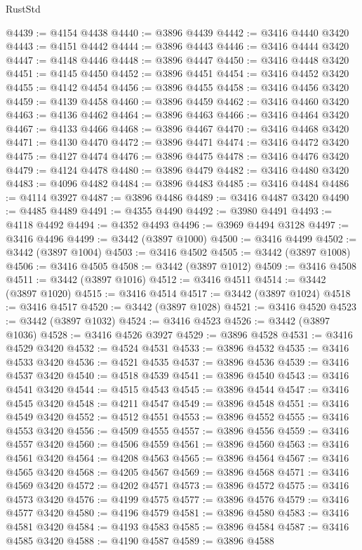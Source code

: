 \begin{lexlean}{RustStd}
\begin{coremodule}
@4439 := @4154 @4438
@4440 := @3896 @4439
@4442 := @3416 @4440 @3420
@4443 := @4151 @4442
@4444 := @3896 @4443
@4446 := @3416 @4444 @3420
@4447 := @4148 @4446
@4448 := @3896 @4447
@4450 := @3416 @4448 @3420
@4451 := @4145 @4450
@4452 := @3896 @4451
@4454 := @3416 @4452 @3420
@4455 := @4142 @4454
@4456 := @3896 @4455
@4458 := @3416 @4456 @3420
@4459 := @4139 @4458
@4460 := @3896 @4459
@4462 := @3416 @4460 @3420
@4463 := @4136 @4462
@4464 := @3896 @4463
@4466 := @3416 @4464 @3420
@4467 := @4133 @4466
@4468 := @3896 @4467
@4470 := @3416 @4468 @3420
@4471 := @4130 @4470
@4472 := @3896 @4471
@4474 := @3416 @4472 @3420
@4475 := @4127 @4474
@4476 := @3896 @4475
@4478 := @3416 @4476 @3420
@4479 := @4124 @4478
@4480 := @3896 @4479
@4482 := @3416 @4480 @3420
@4483 := @4096 @4482
@4484 := @3896 @4483
@4485 := @3416 @4484
@4486 := @4114 @3927
@4487 := @3896 @4486
@4489 := @3416 @4487 @3420
@4490 := @4485 @4489
@4491 := @4355 @4490
@4492 := @3980 @4491
@4493 := @4118 @4492
@4494 := @4352 @4493
@4496 := @3969 @4494 @3128
@4497 := @3416 @4496
@4499 := @3442 (@3897 @1000)
@4500 := @3416 @4499
@4502 := @3442 (@3897 @1004)
@4503 := @3416 @4502
@4505 := @3442 (@3897 @1008)
@4506 := @3416 @4505
@4508 := @3442 (@3897 @1012)
@4509 := @3416 @4508
@4511 := @3442 (@3897 @1016)
@4512 := @3416 @4511
@4514 := @3442 (@3897 @1020)
@4515 := @3416 @4514
@4517 := @3442 (@3897 @1024)
@4518 := @3416 @4517
@4520 := @3442 (@3897 @1028)
@4521 := @3416 @4520
@4523 := @3442 (@3897 @1032)
@4524 := @3416 @4523
@4526 := @3442 (@3897 @1036)
@4528 := @3416 @4526 @3927
@4529 := @3896 @4528
@4531 := @3416 @4529 @3420
@4532 := @4524 @4531
@4533 := @3896 @4532
@4535 := @3416 @4533 @3420
@4536 := @4521 @4535
@4537 := @3896 @4536
@4539 := @3416 @4537 @3420
@4540 := @4518 @4539
@4541 := @3896 @4540
@4543 := @3416 @4541 @3420
@4544 := @4515 @4543
@4545 := @3896 @4544
@4547 := @3416 @4545 @3420
@4548 := @4211 @4547
@4549 := @3896 @4548
@4551 := @3416 @4549 @3420
@4552 := @4512 @4551
@4553 := @3896 @4552
@4555 := @3416 @4553 @3420
@4556 := @4509 @4555
@4557 := @3896 @4556
@4559 := @3416 @4557 @3420
@4560 := @4506 @4559
@4561 := @3896 @4560
@4563 := @3416 @4561 @3420
@4564 := @4208 @4563
@4565 := @3896 @4564
@4567 := @3416 @4565 @3420
@4568 := @4205 @4567
@4569 := @3896 @4568
@4571 := @3416 @4569 @3420
@4572 := @4202 @4571
@4573 := @3896 @4572
@4575 := @3416 @4573 @3420
@4576 := @4199 @4575
@4577 := @3896 @4576
@4579 := @3416 @4577 @3420
@4580 := @4196 @4579
@4581 := @3896 @4580
@4583 := @3416 @4581 @3420
@4584 := @4193 @4583
@4585 := @3896 @4584
@4587 := @3416 @4585 @3420
@4588 := @4190 @4587
@4589 := @3896 @4588

\end{coremodule}
\end{lexlean}
